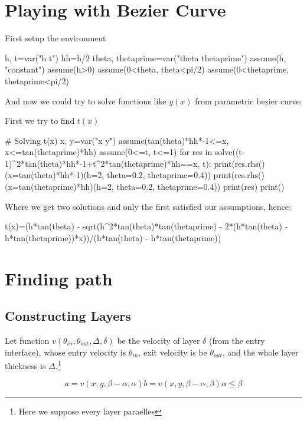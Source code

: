 \documentclass[preprint]{ptephy_v1}%
\begin{document}
\section{Playing with Bezier Curve}
First setup the environment
\begin{sageblock}
h, t=var("h t")
hh=h/2
theta, thetaprime=var("theta thetaprime")
assume(h, "constant")
assume(h>0)
assume(0<theta, theta<pi/2)
assume(0<thetaprime, thetaprime<pi/2)
\end{sageblock}

And now we could try to solve functions like $y(x)$ from parametric bezier curve:

First we try to find $t(x)$
\begin{sageverbatim}
# Solving t(x)
x, y=var("x y")
assume(tan(theta)*hh*-1<=x, x<=tan(thetaprime)*hh)
assume(0<=t, t<=1)
for res in solve((t-1)^2*tan(theta)*hh*-1+t^2*tan(thetaprime)*hh==x, t):
    print(res.rhs()(x=tan(theta)*hh*-1)(h=2, theta=0.2, thetaprime=0.4))
    print(res.rhs()(x=tan(thetaprime)*hh)(h=2, theta=0.2, thetaprime=0.4))
    print(res)
    print()
\end{sageverbatim}
Where we get two solutions and only the first satisfied our assumptions, hence:
\begin{sageblock}
t(x)=(h*tan(theta) - sqrt(h^2*tan(theta)*tan(thetaprime) - 2*(h*tan(theta) - h*tan(thetaprime))*x))/(h*tan(theta) - h*tan(thetaprime))
\end{sageblock}


\newpage
\section{Finding path}
\subsection{Constructing Layers}
Let function $v(\theta_{in}, \theta_{out}, \Delta, \delta)$ be the velocity of layer $\delta$ (from the entry interface), whose entry velocity is $\theta_{in}$, exit velocity is be $\theta_{out}$, and the whole layer thickness is $\Delta$.\footnote{Here we suppose every layer paraelles}


\begin{subequations}
\begin{equation}
a=v(x, y, \beta-\alpha, \alpha)
\end{equation}
\begin{equation}
b=v(x, y, \beta-\alpha, \beta)
\end{equation}
\begin{equation}
\alpha\leq\beta
\end{equation}
\end{subequations}
\end{document}
